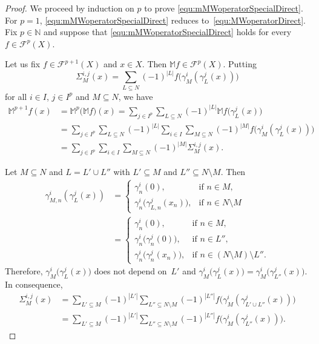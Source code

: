 \documentclass{amsart}
\theoremstyle{plain}%
\theoremstyle{definition}
\theoremstyle{remark}
\begin{document}
\begin{proof}
We proceed by induction on $p$ to prove \eqref{equ:mMWoperatorSpecialDirect}.
For $p=1$, \eqref{equ:mMWoperatorSpecialDirect} reduces to~\eqref{equ:MWoperatorDirect}. Fix $p\in\mathbb N$ and suppose that \eqref{equ:mMWoperatorSpecialDirect} holds for every $f\in \mathcal{F}^p(X)$.

Let us fix $f\in\mathcal{F}^{p+1}(X)$ and $x\in X$. Then $\mathbb{M}f\in\mathcal{F}^p(X)$. Putting 
\begin{equation*}
\Sigma_M^{i,j}(x)=\sum_{L\subseteq N}(-1)^{|L|}f\big(\gamma^i_M(\gamma^j_L(x))\big)
\end{equation*}
for all $i\in I$, $j\in I^p$ and $M\subseteq N$, we have
\begin{equation}\label{equ:MWspecial(p+1)}
\begin{split}
\mathbb{M}^{p+1} f(x)&=\mathbb{M}^p\big(\mathbb{M} f\big)(x)
=\sum_{j\in I^p}\sum_{L\subseteq N}(-1)^{|L|}\mathbb{M}f\big(\gamma^j_L(x)\big)\\
&=\sum_{j\in I^p}\sum_{L\subseteq N}(-1)^{|L|}
\sum_{i\in I}\sum_{M\subseteq N}(-1)^{|M|}f\big(\gamma^i_M(\gamma^j_L(x))\big)\\
&=\sum_{j\in I^p}\sum_{i\in I}\sum_{M\subseteq N}(-1)^{|M|}\Sigma_M^{i,j}(x).
\end{split}
\end{equation}

Let $M\subseteq N$ and $L=L'\cup L''$ with $L'\subseteq M$ and $L''\subseteq N\setminus M$. Then
\begin{equation}\label{equ:gammaKLij}
\begin{split}
\gamma^i_{M,n}(\gamma^j_L(x))
&=\begin{cases}
\gamma^i_n(0),&\text{if }n\in M,\\
\gamma^i_n\big(\gamma^j_{L,n}(x_n)\big),&\text{if }n\in  N\setminus M
\end{cases}\\
&=\begin{cases}
\gamma^i_n(0),&\text{if }n\in M,\\
\gamma^i_n\big(\gamma^j_n(0)\big),&\text{if }n\in L'',\\
\gamma^i_n\big(\gamma^j_n(x_n)\big),&\text{if }n\in (N\setminus M)\setminus L''.
\end{cases}
\end{split}
\end{equation}
Therefore, $\gamma^i_M\big(\gamma^j_L(x)\big)$ does not depend on~$L'$ and
$\gamma^i_M\big(\gamma^j_L(x)\big)=\gamma^i_M\big(\gamma^j_{L''}(x)\big)$.
In consequence, 
\begin{equation}\label{Sigma}
\begin{split}
\Sigma_M^{i,j}(x)&=\sum_{L'\subseteq M}(-1)^{|L'|}\sum_{L''\subseteq N\setminus M}(-1)^{|L''|}
f\big(\gamma^i_M(\gamma^j_{L'\cup L''}(x))\big)\\
&=\sum_{L'\subseteq M}(-1)^{|L'|}\sum_{L''\subseteq N\setminus M}
(-1)^{|L''|}f\big(\gamma^i_M(\gamma^j_{ L''}(x))\big).	
\end{split}		
\end{equation}


\end{proof}
\end{document}
